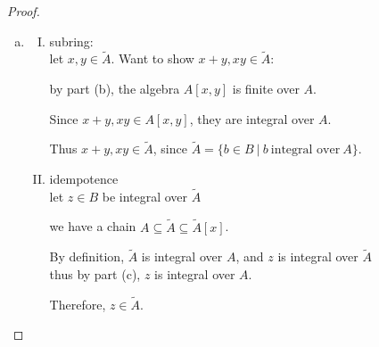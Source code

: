 \documentclass{article}
\theoremstyle{definition}
\begin{document}
\begin{proof}
\begin{enumerate}[a.]
      Therefore, $x$ is integral over $A$.

    \item
      \begin{enumerate}[I.]
        \item subring:\\
          let $x,y \in \tilde{A}$. Want to show $x+y, xy \in \tilde{A}$:

          by part (b), the algebra $A[x,y]$ is finite over $A$.

          Since $x+y,xy \in A[x,y]$, they are integral over $A$.

          Thus $x+y, xy \in \tilde{A}$, since $\tilde{A} = \{ b \in B ~|~ b ~\text{integral over}~ A \}$.

        \item idempotence\\
          let $z \in B$ be integral over $\tilde{A}$
          
          we have a chain $A \subseteq \tilde{A} \subseteq \tilde{A}[x]$.

          By definition, $\tilde{A}$ is integral over $A$, and $z$ is integral over $\tilde{A}$\\
          thus by part (c), $z$ is integral over $A$.

          Therefore, $z \in \tilde{A}$.
      \end{enumerate}
  \end{enumerate}
\end{proof}
\end{document}
